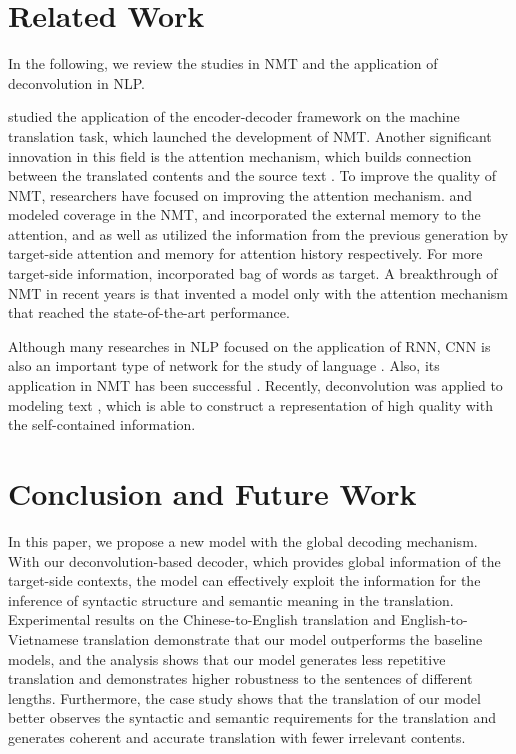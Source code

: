 \documentclass[11pt]{article}
\begin{document}
\begin{CJK}{UTF8}{gbsn}
\section{Related Work}

In the following, we review the studies in NMT and the application of deconvolution in NLP.

\citet{Kalchbrenner,ChoEA2014,seq2seq} studied the application of the encoder-decoder framework on the machine translation task, which launched the development of NMT. Another significant innovation in this field is the attention mechanism, which builds connection between the translated contents and the source text \citep{attention,stanfordattention}. To improve the quality of NMT, researchers have focused on improving the attention mechanism. \citet{coverage} and \citet{micover} modeled coverage in the NMT, \citet{interactive} and \citet{multichannel} incorporated the external memory to the attention, and \citet{target_attention} as well as \citet{aca} utilized the information from the previous generation by target-side attention and memory for attention history respectively. For more target-side information, \citet{BOW_Ma} incorporated bag of words as target. A breakthrough of NMT in recent years is that \citet{googleattention} invented a model only with the attention mechanism that reached the state-of-the-art performance.

Although many researches in NLP focused on the application of RNN, CNN is also an important type of network for the study of language \citep{kimconv, kalconv, zhangconv, global_encoding}. Also, its application in NMT has been successful \citep{fairseq}. Recently, deconvolution was applied to modeling text \citep{deconvolution,deconvseq}, which is able to construct a representation of high quality with the self-contained information.



\section{Conclusion and Future Work}
\label{conclusion}

In this paper, we propose a new model with the global decoding mechanism. With our deconvolution-based decoder, which provides global information of the target-side contexts, the model can effectively exploit the information for the inference of syntactic structure and semantic meaning in the translation. Experimental results on the Chinese-to-English translation and English-to-Vietnamese translation demonstrate that our model outperforms the baseline models, and the analysis shows that our model generates less repetitive translation and demonstrates higher robustness to the sentences of different lengths. Furthermore, the case study shows that the translation of our model better observes the syntactic and semantic requirements for the translation and generates coherent and accurate translation with fewer irrelevant contents.


\end{CJK}
\end{document}
